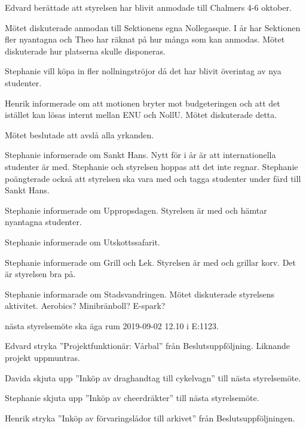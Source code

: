 \documentclass[10pt]{article}
\begin{document}
\begin{paragrafer}
Edvard berättade att styrelsen har blivit anmodade till Chalmers 4-6 oktober. 

Mötet diskuterade anmodan till Sektionens egna Nollegasque. I år har Sektionen fler nyantagna och Theo har räknat på hur många som kan anmodas. Mötet diskuterade hur platserna skulle disponeras.


Stephanie vill köpa in fler nollningströjor då det har blivit överintag av nya studenter. 

Henrik informerade om att motionen bryter mot budgeteringen och att det istället kan lösas internt mellan ENU och NollU. Mötet diskuterade detta. 

Mötet beslutade att avslå alla yrkanden. 

Stephanie informerade om Sankt Hans. Nytt för i år är att internationella studenter är med.
Stephanie och styrelsen hoppas att det inte regnar. Stephanie poängterade också att styrelsen ska vara med och tagga studenter under färd till Sankt Hans. 

Stephanie informerade om Uppropsdagen. Styrelsen är med och hämtar nyantagna studenter. 

Stephanie informerade om Utskottssafarit. 

Stephanie informerade om Grill och Lek. Styrelsen är med och grillar korv. Det är styrelsen bra på.  

Stephanie informarade om Stadsvandringen. Mötet diskuterade styrelsens aktivitet. Aerobics? Minibränboll? E-spark? 


\Mba nästa styrelsemöte ska äga rum 2019-09-02 12.10 i E:1123.


Edvard \ypa stryka ''Projektfunktionär: Vårbal'' från Beslutsuppföljning. Liknande projekt uppmuntras.

\Mbaby

Davida \ypa skjuta upp ''Inköp av draghandtag till cykelvagn'' till nästa styrelsemöte.

\Mbaby

Stephanie \ypa skjuta upp ''Inköp av cheerdräkter'' till nästa styrelsemöte. 

\Mbaby

Henrik \ypa stryka ''Inköp av förvaringslådor till arkivet'' från Beslutsuppföljningen. 

\Mbaby


\end{paragrafer}
\end{document}
